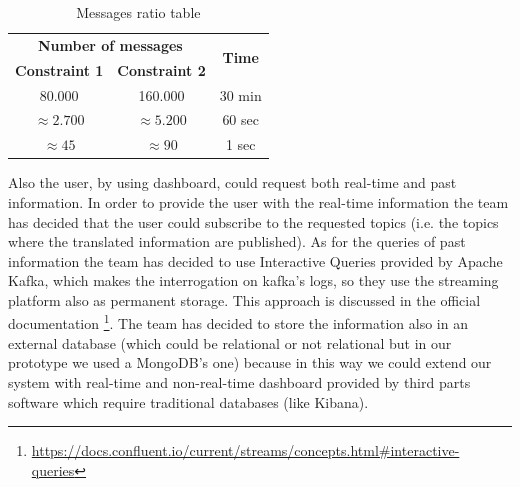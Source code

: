 \begin{table}[H]
\caption{Messages ratio table}
\centering
\begin{tabular}{ |c|c|c| } \hline
\multicolumn{2}{|c|}{\textbf{Number of messages}} & \multirow{2}{2em}{\textbf{Time}} \\ \cline{1-2}
\textbf{Constraint 1} & \textbf{Constraint 2} & \\ \hline
80.000 & 160.000 & 30 min \\ \hline
$\approx2.700$ & $\approx5.200$ & 60 sec \\ \hline
$\approx45$ & $\approx 90$ & 1 sec \\ \hline
\end{tabular}
\label{table1}
\end{table}

Also the user, by using dashboard, could request both real-time and past information.
In order to provide the user with the real-time information the team has decided that the user could subscribe to the requested topics (i.e. the topics where the translated information are published).
As for the queries of past information the team has decided to use Interactive Queries provided by Apache Kafka, which makes the interrogation on kafka's logs, so they use the streaming platform also as permanent storage. This approach is discussed in the official documentation \footnote{\url{https://docs.confluent.io/current/streams/concepts.html\#interactive-queries}}.
The team has decided to store the information also in an external database (which could be relational or not relational but in our prototype we used a MongoDB's one) because in this way we could extend our system with real-time and non-real-time dashboard provided by third parts software which require traditional databases (like Kibana). 



